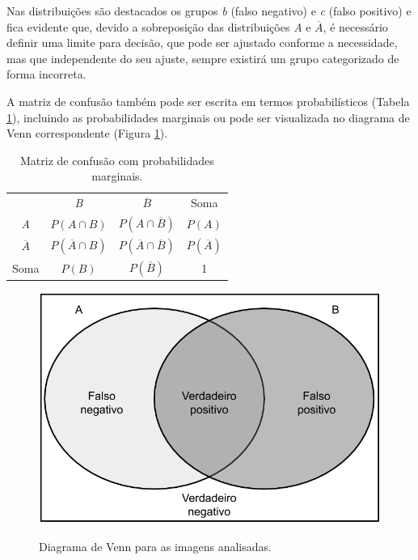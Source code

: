 Nas distribuições são destacados os grupos \textit{b} (falso negativo) e \textit{c} (falso positivo) e fica evidente que, devido a sobreposição das distribuições \textit{A} e $\overline{A}$, é necessário definir uma limite para decisão, que pode ser ajustado conforme a necessidade, mas que independente do seu ajuste, sempre existirá um grupo categorizado de forma incorreta.

A matriz de confusão também pode ser escrita em termos probabilísticos (Tabela \ref{tab:matriz_de_confusao_probab}), incluindo as probabilidades marginais ou pode ser visualizada no diagrama de Venn correspondente (Figura \ref{fig:venn_diagram}).

\begin{table}[htbp]
    \caption{Matriz de confusão com probabilidades marginais.}
    \label{tab:matriz_de_confusao_probab}
    \centering
    \begin{tabular}{cccc}\hline\hline
                       & \textit{B}               & $\overline{B}$                      & Soma              \\
        \textit{A}     & $P(A \cap B)$            & $P(A \cap \overline{B})$            & $P(A)$            \\
        $\overline{A}$ & $P(\overline{A} \cap B)$ & $P(\overline{A} \cap \overline{B})$ & $P(\overline{A})$ \\
        Soma           & $P(B)$                   & $P(\overline{B})$                   & 1                 \\
        \hline\hline
    \end{tabular}
\end{table}

\begin{figure}[htbp]
    \centering
    \caption{Diagrama de Venn para as imagens analisadas.}
    \includegraphics[scale=.4]{figs/venn-diagram.png}
    \label{fig:venn_diagram}
\end{figure}

